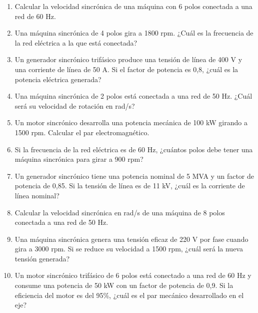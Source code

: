 \documentclass[../main]{subfiles}
\begin{document}
\begin{enumerate}
    \item Calcular la velocidad sincrónica de una máquina con 6 polos conectada a una red de 60 Hz.
    \item Una máquina sincrónica de 4 polos gira a 1800 rpm. ¿Cuál es la frecuencia de la red eléctrica a la que está conectada?
    \item Un generador sincrónico trifásico produce una tensión de línea de 400 V y una corriente de línea de 50 A. Si el factor de potencia es 0,8, ¿cuál es la potencia eléctrica generada?
    \item Una máquina sincrónica de 2 polos está conectada a una red de 50 Hz. ¿Cuál será su velocidad de rotación en rad/s?
    \item Un motor sincrónico desarrolla una potencia mecánica de 100 kW girando a 1500 rpm. Calcular el par electromagnético.
    \item Si la frecuencia de la red eléctrica es de 60 Hz, ¿cuántos polos debe tener una máquina sincrónica para girar a 900 rpm?
    \item Un generador sincrónico tiene una potencia nominal de 5 MVA y un factor de potencia de 0,85. Si la tensión de línea es de 11 kV, ¿cuál es la corriente de línea nominal?
    \item Calcular la velocidad sincrónica en rad/s de una máquina de 8 polos conectada a una red de 50 Hz.
    \item Una máquina sincrónica genera una tensión eficaz de 220 V por fase cuando gira a 3000 rpm. Si se reduce su velocidad a 1500 rpm, ¿cuál será la nueva tensión generada?
    \item Un motor sincrónico trifásico de 6 polos está conectado a una red de 60 Hz y consume una potencia de 50 kW con un factor de potencia de 0,9. Si la eficiencia del motor es del 95\%, ¿cuál es el par mecánico desarrollado en el eje?
\end{enumerate}
\end{document}
